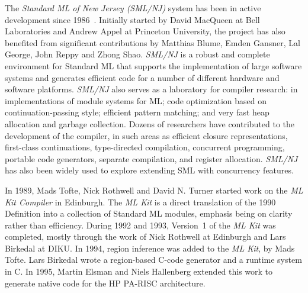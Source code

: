   The {\em Standard ML of New Jersey (SML/NJ)} system has been in active development
  since 1986~\cite{am87,am91}.
  Initially started by David MacQueen at Bell Laboratories and Andrew Appel at Princeton University,
  the project has also benefited from significant contributions
  by Matthias Blume, Emden Gansner, Lal George, John Reppy and Zhong Shao.
  {\em SML/NJ} is a robust and complete environment for Standard ML that supports
  the implementation of large software systems and generates efficient code for a
  number of different hardware and software platforms.  {\em SML/NJ} also serves as
  a laboratory for compiler research: in implementations of module systems for ML;
  code optimization based on continuation-passing style; efficient pattern matching;
  and very fast heap allocation and garbage collection.  Dozens of researchers
  have contributed to the development of the compiler, in such areas as
  efficient closure representations, first-class continuations, type-directed
  compilation, concurrent programming, portable code generators, separate
  compilation, and register allocation.
  {\em SML/NJ} has also been widely used to explore extending SML with
  concurrency features.



In 1989, Mads Tofte, Nick Rothwell and David N. Turner started work on the
{\em ML Kit Compiler} in Edinburgh. The {\em ML Kit} is a direct translation
of the 1990 Definition into a collection of Standard ML modules, emphasis being
on clarity rather than efficiency. During 1992 and 1993, Version~1 of the {\em
ML Kit} was completed, mostly through the work of Nick Rothwell at Edinburgh
and Lars Birkedal at DIKU\cite{BRTT}. In 1994, region inference was added to
the {\em ML Kit}, by Mads Tofte. Lars Birkedal wrote a region-based C-code
generator and a runtime system in C.  In 1995, Martin Elsman and Niels
Hallenberg extended this work to generate native code for the HP PA-RISC
architecture.

